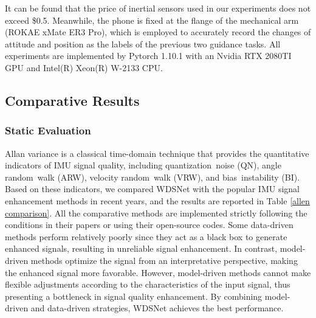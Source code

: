 \documentclass[letterpaper]{article} %
\begin{document}
	It can be found that the price of inertial sensors used in our experiments does not exceed \$0.5.
	Meanwhile, the phone is fixed at the flange of the mechanical arm (ROKAE xMate ER3 Pro), which is employed to accurately record the changes of attitude and position as the labels of the previous two guidance tasks.
	All experiments are implemented by Pytorch 1.10.1 with an Nvidia RTX 2080TI GPU and Intel(R) Xeon(R) W-2133 CPU.

	\subsection{Comparative Results}
	\subsubsection{Static Evaluation}
	Allan variance is a classical time-domain technique that provides the quantitative indicators of IMU signal quality, including quantization noise (QN), angle random walk (ARW), velocity random walk (VRW), and bias instability (BI).
	Based on these indicators, we compared WDSNet with the popular IMU signal enhancement methods in recent years, and the results are reported in Table \ref{allen comparison}.
	All the comparative methods are implemented strictly following the conditions in their papers or using their open-source codes.
	Some data-driven methods perform relatively poorly since they act as a black box to generate enhanced signals, resulting in unreliable signal enhancement. In contrast, model-driven methods optimize the signal from an interpretative perspective, making the enhanced signal more favorable. However, model-driven methods cannot make flexible adjustments according to the characteristics of the input signal, thus presenting a bottleneck in signal quality enhancement.
	By combining model-driven and data-driven strategies, WDSNet achieves the best performance.
\end{document}
